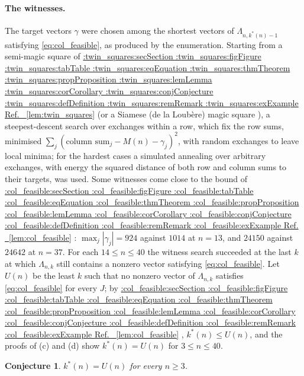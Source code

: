 \documentclass[11pt,a4paper]{article}
\makeatletter
\def\Cref@getprefix#1:#2\relax{#1}
\def\Cref@prefix@sec{sec}
\def\Cref@prefix@fig{fig}
\def\Cref@prefix@tab{tab}
\def\Cref@prefix@eq{eq}
\def\Cref@prefix@thm{thm}
\def\Cref@prefix@prop{prop}
\def\Cref@prefix@lem{lem}
\def\Cref@prefix@cor{cor}
\def\Cref@prefix@conj{conj}
\def\Cref@prefix@def{def}
\def\Cref@prefix@rem{rem}
\def\Cref@prefix@ex{ex}
\def\Cref@type@cap#1{%
  \edef\Cref@tmp{#1}%
  \ifx\Cref@tmp\Cref@prefix@sec Section%
  \else\ifx\Cref@tmp\Cref@prefix@fig Figure%
  \else\ifx\Cref@tmp\Cref@prefix@tab Table%
  \else\ifx\Cref@tmp\Cref@prefix@eq Equation%
  \else\ifx\Cref@tmp\Cref@prefix@thm Theorem%
  \else\ifx\Cref@tmp\Cref@prefix@prop Proposition%
  \else\ifx\Cref@tmp\Cref@prefix@lem Lemma%
  \else\ifx\Cref@tmp\Cref@prefix@cor Corollary%
  \else\ifx\Cref@tmp\Cref@prefix@conj Conjecture%
  \else\ifx\Cref@tmp\Cref@prefix@def Definition%
  \else\ifx\Cref@tmp\Cref@prefix@rem Remark%
  \else\ifx\Cref@tmp\Cref@prefix@ex Example%
  \else Ref.%
  \fi\fi\fi\fi\fi\fi\fi\fi\fi\fi\fi\fi
}
\DeclareRobustCommand{\Cref}[1]{%
  \begingroup
  \edef\Cref@label{#1}%
  \edef\Cref@prefix{\expandafter\Cref@getprefix\Cref@label:\relax}%
  \hyperref[#1]{\Cref@type@cap{\Cref@prefix}~\ref*{#1}}%
  \endgroup
}
\theoremstyle{plain}
\newtheorem{conjecture}[theorem]{Conjecture}
\theoremstyle{definition}
\theoremstyle{remark}
\makeatother
\begin{document}
\paragraph{The witnesses.}
The target vectors $\gamma$ were chosen among the shortest vectors of $\Lambda_{n,k^*(n)-1}$ satisfying \eqref{eq:col_feasible}, as produced by the enumeration.
Starting from a semi-magic square of \Cref{lem:twin_squares} (or a Siamese (de la Loub\`ere) magic square \cite{andrews1960magic}), a steepest-descent search over exchanges within a row, which fix the row sums, minimised $\sum_j(\text{column sum}_j-M(n)-\gamma_j)^2$, with random exchanges to leave local minima; for the hardest cases a simulated annealing over arbitrary exchanges, with energy the squared distance of both row and column sums to their targets, was used.
Some witnesses come close to the bound of \Cref{lem:col_feasible}: $\max_j|\gamma_j|=924$ against $1014$ at $n=13$, and $24150$ against $24642$ at $n=37$.
For each $14\le n\le40$ the witness search succeeded at the last $k$ at which $\Lambda_{n,k}$ still contains a nonzero vector satisfying \eqref{eq:col_feasible}.
Let $U(n)$ be the least $k$ such that no nonzero vector of $\Lambda_{n,k}$ satisfies \eqref{eq:col_feasible} for every $J$; by \Cref{lem:col_feasible}, $k^*(n)\le U(n)$, and the proofs of (c) and (d) show $k^*(n)=U(n)$ for $3\le n\le40$.

\begin{conjecture}
\label{conj:lattice}
$k^*(n)=U(n)$ for every $n\ge3$.
\end{conjecture}
\end{document}
